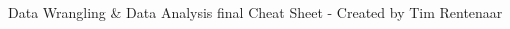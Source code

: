 \documentclass[a4paper,7pt,landscape]{extarticle}
\begin{document}
\begin{multicols}{3}
\begin{boxA}
\end{boxA}

Data Wrangling \& Data Analysis final Cheat Sheet  - Created by Tim Rentenaar

\end{multicols}
\end{document}
